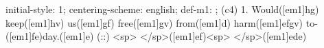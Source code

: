 initial-style: 1;
centering-scheme: english;
def-m1: \grealign;
(c4) 1. Would([em1]hg) keep([em1]hv) us([em1]gf) free([em1]gv) from([em1]d) harm([em1]efgv) to-([em1]fe)day.([em1]e) (::) <sp> </sp>([em1]ef)<sp>   </sp>([em1]ede)